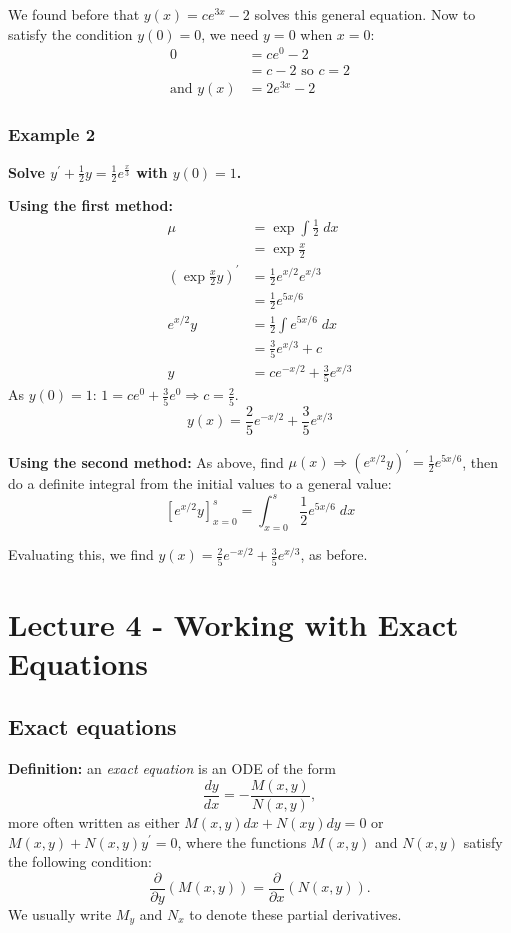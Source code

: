 \documentclass[11pt]{article}
\newcommand{\fdx}{\frac{dy}{dx}} %
\newcommand{\yp}{y^{\prime}}
\newcommand{\fpdx}{\frac{\partial}{\partial x}} %
\newcommand{\fpdy}{\frac{\partial}{\partial y}} %
\begin{document}
	We found before that $y(x) = c e^{3x} - 2$ solves this general equation. Now to satisfy the condition $y(0) = 0$, we need $y = 0$ when $x = 0$:
	\begin{align*}
		0 &= c e^0 - 2 \\
		&= c - 2 \text{ so } c = 2 \\
		\text{and } y(x) &= 2 e^{3x} - 2
	\end{align*}

\subsubsection{Example 2}
	\textbf{Solve $\yp + \frac{1}{2} y = \frac{1}{2} e^{\frac{x}{3}}$ with $y(0) = 1$.}

	\textbf{Using the first method:}
		\begin{align*}
			\mu &= \exp{\int \frac{1}{2} \; dx} \\
				&= \exp{\frac{x}{2}} \\
			(\exp{\frac{x}{2}}y)^{\prime} &= \frac{1}{2} e^{x/2} e^{x/3} \\
				&= \frac{1}{2} e^{5x/6} \\
			e^{x/2} y &= \frac{1}{2} \int e^{5x/6} \; dx \\
				&= \frac{3}{5} e^{x/3} + c \\
			y &= c e^{-x/2} + \frac{3}{5} e^{x/3}
		\end{align*}
		As $y(0) = 1$: $1 = c e^0 + \frac{3}{5} e^0 \Rightarrow c = \frac{2}{5}$.
		$$ y(x) = \frac{2}{5} e^{-x/2} + \frac{3}{5} e^{x/3} $$

	\textbf{Using the second method:} As above, find $\mu(x) \Rightarrow (e^{x/2} y)^{\prime} = \frac{1}{2} e^{5x/6}$, then do a definite integral from the initial values to a general value:
		$$ \left[ e^{x/2} y \right]_{x=0}^s = \int_{x=0}^s \frac{1}{2} e^{5x/6} \; dx $$

		Evaluating this, we find $y(x) = \frac{2}{5} e^{-x/2} + \frac{3}{5} e^{x/3}$, as before.

\section{Lecture 4 - Working with Exact Equations}
\subsection{Exact equations}
	\textbf{Definition:} an \emph{exact equation} is an ODE of the form
		$$ \fdx = - \frac{M(x,y)}{N(x,y)}, $$
	more often written as either $M(x,y) dx + N(xy) dy = 0$ or $M(x,y) + N(x,y) \yp = 0$, where the functions $M(x,y)$ and $N(x,y)$ satisfy the following condition:
		$$ \fpdy (M(x,y)) = \fpdx (N(x,y)). $$
	We usually write $M_y$ and $N_x$ to denote these partial derivatives.
\end{document}
